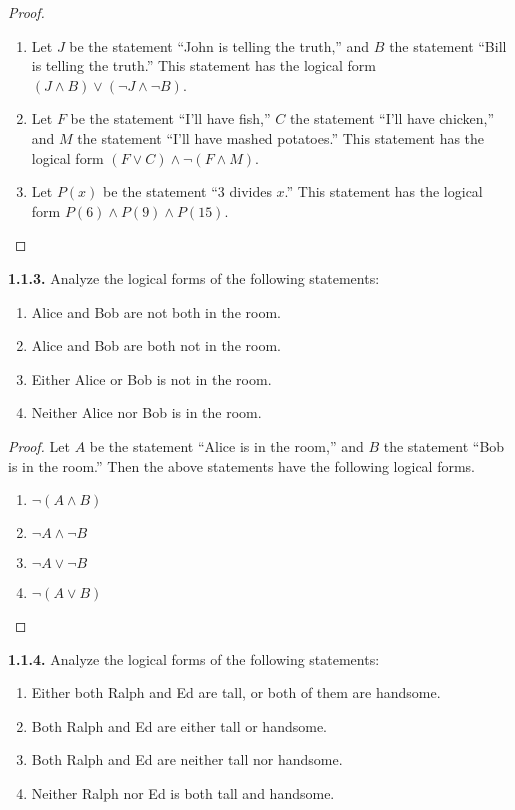 \documentclass[12pt]{amsart}
\newenvironment{statement}[1]{\smallskip\noindent\color[rgb]{.6627, .3529, .6314} {\bf #1.}}{}
\theoremstyle{definition}
\theoremstyle{remark}
\begin{document}
\begin{proof}
\hfill
\begin{enumerate}
	\item Let $J$ be the statement ``John is telling the truth,'' and $B$ the statement ``Bill is telling the truth.''
	This statement has the logical form $(J \wedge B) \vee (\neg J \wedge \neg B)$.
	
	\item Let $F$ be the statement ``I'll have fish,'' $C$ the statement ``I'll have chicken,'' and $M$ the statement ``I'll have mashed potatoes.''
	This statement has the logical form $(F \vee C) \wedge \neg (F \wedge M)$.
	
	\item Let $P(x)$ be the statement ``3 divides $x$.''
	This statement has the logical form $P(6) \wedge P(9) \wedge P(15)$.
\end{enumerate}
\end{proof}


\begin{statement}{1.1.3}
Analyze the logical forms of the following statements:
\begin{enumerate}
	\item Alice and Bob are not both in the room.
	\item Alice and Bob are both not in the room.
	\item Either Alice or Bob is not in the room.
	\item Neither Alice nor Bob is in the room.
\end{enumerate}
\end{statement}

\begin{proof}
Let $A$ be the statement ``Alice is in the room,'' and $B$ the statement ``Bob is in the room.''
Then the above statements have the following logical forms.
\begin{enumerate}
	\item $\neg (A \wedge B)$
	\item $\neg A \wedge \neg B$
	\item $\neg A \vee \neg B$
	\item $\neg (A \vee B)$
\end{enumerate}
\end{proof}


\begin{statement}{1.1.4}
Analyze the logical forms of the following statements:
\begin{enumerate}
	\item Either both Ralph and Ed are tall, or both of them are handsome.
	\item Both Ralph and Ed are either tall or handsome.
	\item Both Ralph and Ed are neither tall nor handsome.
	\item Neither Ralph nor Ed is both tall and handsome.
\end{enumerate}
\end{statement}
\end{document}
